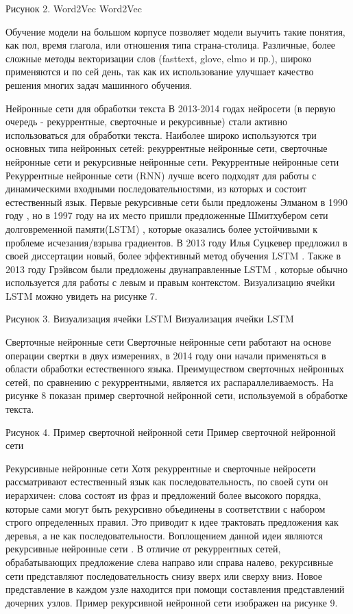 Рисунок 2. Word2Vec
Word2Vec

Обучение модели на большом корпусе позволяет модели выучить такие понятия, как пол, время глагола, или отношения типа страна-столица. Различные, более сложные методы векторизации слов (fasttext, glove, elmo и пр.), широко применяются и по сей день, так как их использование улучшает качество решения многих задач машинного обучения.


Нейронные сети для обработки текста
В 2013-2014 годах нейросети (в первую очередь - рекуррентные, сверточные и рекурсивные) стали активно использоваться для обработки текста.  Наиболее широко используются три основных типа нейронных сетей: рекуррентные нейронные сети, сверточные нейронные сети и рекурсивные нейронные сети. 
Рекуррентные нейронные сети
Рекуррентные нейронные сети (RNN) лучше всего подходят для работы с динамическими входными последовательностями, из которых и состоит естественный язык.  Первые рекурсивные сети были предложены Элманом в 1990 году \cite{Elman_1990}, но в 1997 году на их место пришли предложенные Шмитхубером сети долговременной памяти(LSTM) \cite{Hochreiter_Schmidhuber_1997}, которые оказались более устойчивыми к проблеме исчезания/взрыва градиентов. В 2013 году Илья Суцкевер предложил в своей диссертации новый, более эффективный метод обучения LSTM \cite{Suskever_2013}. Также в 2013 году Грэйвсом были предложены двунаправленные LSTM \cite{Graves_Jaitly_Mohamed_2013}, которые обычно используется для работы с левым и правым контекстом. Визуализацию ячейки LSTM можно увидеть на рисунке 7.  


Рисунок 3. Визуализация ячейки LSTM
Визуализация ячейки LSTM


Сверточные нейронные сети
Сверточные нейронные сети работают на основе операции свертки в двух измерениях, в 2014 году \cite{Kalchbrenner_Grefenstette_Blunsom_2014} они начали применяться в области обработки естественного языка. Преимуществом сверточных нейронных сетей, по сравнению с рекуррентными, является их распараллеливаемость. На рисунке 8 показан пример сверточной нейронной сети, используемой в обработке текста.


Рисунок 4. Пример сверточной нейронной сети
Пример сверточной нейронной сети

 Рекурсивные нейронные сети
Хотя рекуррентные и сверточные нейросети рассматривают естественный язык как последовательность, по своей сути он иерархичен: слова состоят из фраз и предложений более высокого порядка, которые сами могут быть рекурсивно объединены в соответствии с набором строго определенных правил. Это приводит к идее трактовать предложения как деревья, а не как последовательности. Воплощением данной идеи являются рекурсивные нейронные сети \cite{Socher_Perelygin_Wu_Chuang_Manning_Ng_Potts_2013}. В отличие от рекуррентных сетей, обрабатывающих предложение слева направо или справа налево, рекурсивные сети представляют последовательность снизу вверх или сверху вниз. Новое представление в каждом узле находится при помощи составления представлений дочерних узлов. Пример рекурсивной нейронной сети изображен на рисунке 9.



